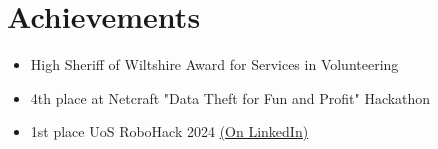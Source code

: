 \section*{Achievements}
\begin{itemize}
    
    \item High Sheriff of Wiltshire Award for Services in Volunteering
    \item 4th place at Netcraft "Data Theft for Fun and Profit" Hackathon
    \item 1st place UoS RoboHack 2024 \href{https://www.linkedin.com/posts/jaretwrintmore_thank-you-southampton-robotics-outreach-activity-7193962844659277824-ULeL}{(On LinkedIn)}
\end{itemize}
